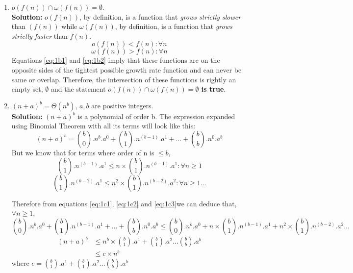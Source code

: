 \documentclass[11pt]{article}
\begin{document}
\begin{enumerate}
    \item $o(f(n)) \cap \omega(f(n))=\emptyset$. \\
    \textbf{Solution:} $o(f(n))$, by definition, is a function that \textit{grows strictly slower} than $(f(n))$ while $\omega(f(n))$, by definition, is a function that \textit{grows strictly faster} than $f(n)$.
    \begin{equation} \label{eq:1b1}
    	o(f(n)) < f(n) : \forall n
    \end{equation} 
    \begin{equation} \label{eq:1b2}
	    \omega(f(n)) > f(n) : \forall n
    \end{equation}
	Equations \ref{eq:1b1} and \ref{eq:1b2} imply that these functions are on the opposite sides of the tightest possible growth rate function and can never be same or overlap. Therefore, the intersection of these functions is rightly an empty set, $\emptyset$ and the statement \textbf{$o(f(n)) \cap \omega(f(n))=\emptyset$ is true}.
    
    \item $(n+a)^b=\Theta(n^b)$, $a, b$ are positive integers. \\
    \textbf{Solution:} $(n+a)^b$ is a polynomial of order b. The expression expanded using Binomial Theorem with all its terms will look like this:
	\begin{equation} \label{eq:1c1}
		  (n+a)^b = {b \choose 0}.n^{b}.a^0 + {b \choose 1}.n^{(b-1)}.a^1 + \ldots + {b \choose b}.n^{0}.a^b
	\end{equation}
	But we know that for terms where order of n is $ \le b$,
	\begin{equation} \label{eq:1c2}
	  {b \choose 1}.n^{(b-1)}.a^1 \leq n \times {b \choose 1}.n^{(b-1)}.a^1 : \forall n \geq 1
	\end{equation}
	\begin{equation} \label{eq:1c3}
		{b \choose 1}.n^{(b-2)}.a^1 \leq n^{2} \times {b \choose 1}.n^{(b-2)}.a^2 : \forall n \geq 1 \ldots
	\end{equation}
		
	Therefore from equations \ref{eq:1c1}, \ref{eq:1c2} and \ref{eq:1c3}we can deduce that, $\forall n \geq 1$, \\
	\begin{equation*}
		{b \choose 0}.n^{b}.a^0 + {b \choose 1}.n^{(b-1)}.a^1 + \ldots + {b \choose b}.n^{0}.a^b \le {b \choose 0}.n^{b}.a^0 +  n \times {b \choose 1}.n^{(b-1)}.a^1 + n^{2} \times {b \choose 1}.n^{(b-2)}.a^{2} \ldots
	\end{equation*}
	\begin{equation*}
	\begin{split}
		(n+a)^b & \le n^{b} \times {b \choose 1}.a^1 + {b \choose 1}.a^{2} \ldots {b \choose b}.a^{b} \\
		& \le c \times n^{b}
	\end{split}
	\end{equation*}
	where $c = {b \choose 1}.a^1 + {b \choose 1}.a^{2} \ldots {b \choose b}.a^{b}$
	

\end{enumerate}
\end{document}
